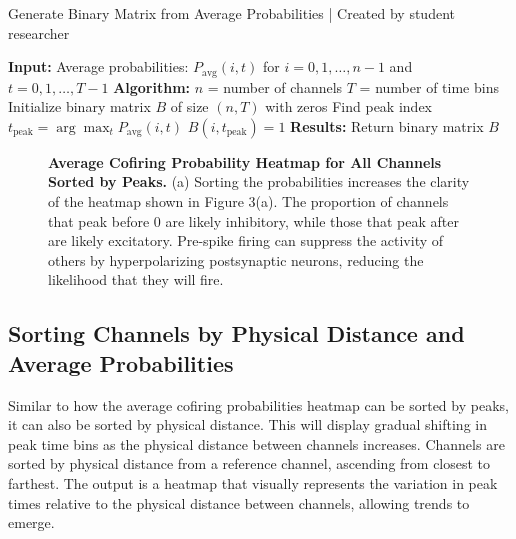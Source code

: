 \documentclass{article} %
\begin{document}
\begin{singlespace}
    \begin{algorithm}
    \caption{Generate Binary Matrix from Average Probabilities | Created by student researcher}
        \begin{algorithmic}[1]
            \State \textbf{Input:}
            \State  Average probabilities: $P_{\text{avg}}(i, t)$ for $i = 0, 1, \ldots, n-1$ and $t = 0, 1, \ldots, T-1$
            \State
            \State \textbf{Algorithm:}
            \State  $n$ = number of channels
            \State  $T$ = number of time bins
            \State  Initialize binary matrix $B$ of size $(n, T)$ with zeros
                \State Find peak index $t_{\text{peak}} = \arg\max_{t} P_{\text{avg}}(i, t)$
                \State $B(i, t_{\text{peak}}) = 1$
            \EndFor
            \State
            \State \textbf{Results:}
            \State  Return binary matrix $B$
        \end{algorithmic}
    \end{algorithm}
\end{singlespace}



\begin{figure}
    \centering
    \caption{\textbf{Average Cofiring Probability Heatmap for All Channels Sorted by Peaks.} (a) Sorting the probabilities increases the clarity of the heatmap shown in Figure 3(a). The proportion of channels that peak before 0 are likely inhibitory, while those that peak after are likely excitatory. Pre-spike firing can suppress the activity of others by hyperpolarizing postsynaptic neurons, reducing the likelihood that they will fire.}
\end{figure}




\subsection{Sorting Channels by Physical Distance and Average Probabilities}
Similar to how the average cofiring probabilities heatmap can be sorted by peaks, it can also be sorted by physical distance. This will display gradual shifting in peak time bins as the physical distance between channels increases. Channels are sorted by physical distance from a reference channel, ascending from closest to farthest. The output is a heatmap that visually represents the variation in peak times relative to the physical distance between channels, allowing trends to emerge.
\end{document}

